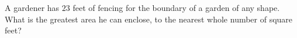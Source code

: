 A gardener has $23$ feet of fencing for the boundary of a garden of any shape. What is the greatest area he can enclose, to the nearest whole number of square feet?
